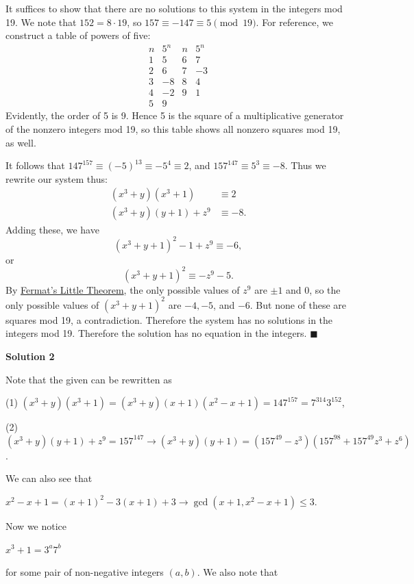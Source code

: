 \begin{enumerate}
It suffices to show that there are no solutions to this system in the integers mod 19.  We note that $152 = 8 \cdot 19$, so $157 \equiv -147 \equiv 5 \pmod{19}$.  For reference, we construct a table of powers of five:
 \[\begin{array}{c|c||c|c} n& 5^n &n & 5^n \\\hline 1 & 5 & 6 & 7 \\ 2 & 6 & 7 & -3 \\ 3 & -8 & 8 & 4 \\ 4 & -2 & 9 & 1 \\ 5 & 9 && \end{array}\]Evidently, the order of 5 is 9.  Hence 5 is the square of a multiplicative generator of the nonzero integers mod 19, so this table shows all nonzero squares mod 19, as well.

 It follows that $147^{157} \equiv (-5)^{13} \equiv -5^4 \equiv 2$, and $157^{147} \equiv 5^3 \equiv -8$.  Thus we rewrite our system thus:
 \begin{align*} (x^3+y)(x^3+1) &\equiv 2 \\ (x^3+y)(y+1) + z^9 &\equiv -8 . \end{align*}
Adding these, we have
 \[(x^3+y+1)^2 - 1 + z^9 \equiv -6,\]or
 \[(x^3+y+1)^2 \equiv -z^9 - 5 .\]By \href{https://artofproblemsolving.com/wiki/index.php?title=Fermat\%27s\_Little\_Theorem}{Fermat's Little Theorem}, the only possible values of $z^9$ are $\pm 1$ and 0, so the only possible values of $(x^3+y+1)^2$ are $-4,-5$, and $-6$.  But none of these are squares mod 19, a contradiction.  Therefore the system has no solutions in the integers mod 19.  Therefore the solution has no equation in the integers.  $\blacksquare$




\textbf{Solution 2}

Note that the given can be rewritten as 

 (1) $(x^3+y)(x^3+1) = (x^3+y)(x+1)(x^2-x+1) = 147^{157} = 7^{314}3^{152}$,

 (2) $(x^3+y)(y+1)+z^9 = 157^{147} \rightarrow (x^3+y)(y+1) = (157^{49}-z^3)(157^{98}+157^{49}z^3+z^6)$.

 We can also see that

 $x^2-x+1 = (x+1)^2-3(x+1)+3 \rightarrow \gcd(x+1, x^2-x+1) \le 3$.

 Now we notice 

 $x^3+1 = 3^a7^b$

 for some pair of non-negative integers $(a,b)$. We also note that 


\end{enumerate}

